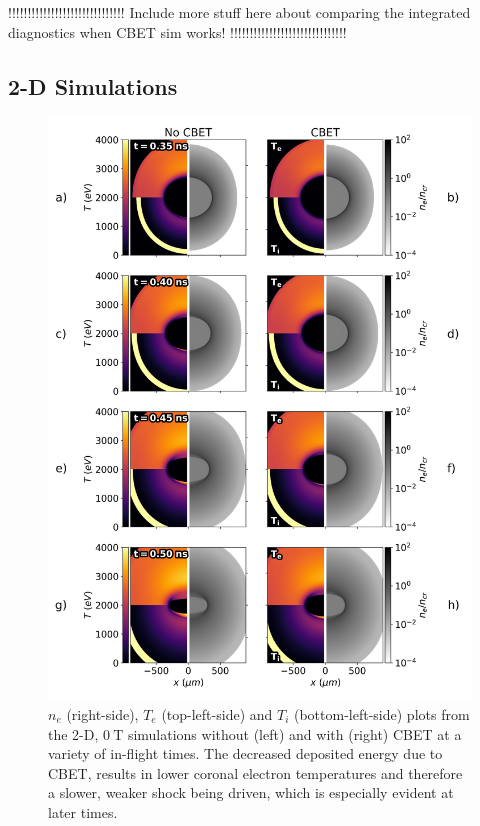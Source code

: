 !!!!!!!!!!!!!!!!!!!!!!!!!!!!!!
Include more stuff here about comparing the integrated diagnostics when CBET sim works!
!!!!!!!!!!!!!!!!!!!!!!!!!!!!!!

\subsection{2-D Simulations}%
\label{sec:Res2_expl2D}

\begin{figure}[t!]
    \includegraphics[width=0.95\linewidth]{Results2/Images/unmag_CBET_onoff.png}
    \centering
    \caption{$n_e$ (right-side), $T_e$ (top-left-side) and $T_i$ (bottom-left-side) plots from the 2-D, $0\ \text{T}$ simulations without (left) and with (right) \ac{CBET} at a variety of in-flight times.
    The decreased deposited energy due to \ac{CBET}, results in lower coronal electron temperatures and therefore a slower, weaker shock being driven, which is especially evident at later times.}%
    \label{fig:Res2_unmag_CBET_onoff}
\end{figure}

